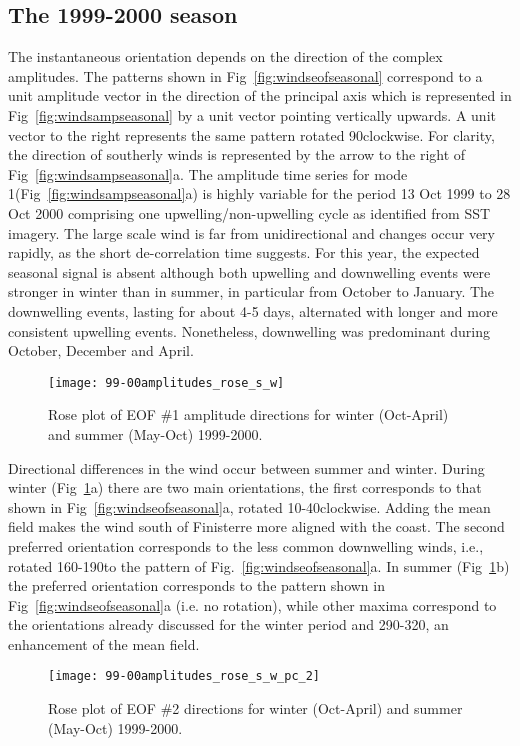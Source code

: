 \subsection{The 1999-2000 season} The instantaneous orientation
depends on the direction of the complex amplitudes. The patterns
shown in Fig~\ref{fig:windseofseasonal} correspond to a unit
amplitude vector in the direction of the principal axis which is
represented in {Fig~\ref{fig:windsampseasonal}} by a unit vector
pointing vertically upwards. A unit vector to the right represents
the same pattern rotated 90\deg clockwise. For clarity, the
direction of southerly winds is represented by the arrow to the
right of Fig~\ref{fig:windsampseasonal}a. The amplitude time
series for mode 1(Fig~\ref{fig:windsampseasonal}a) is highly
variable for the period 13 Oct 1999 to 28 Oct 2000 comprising one
upwelling/non-upwelling cycle as identified from SST imagery. The
large scale wind is far from unidirectional and changes occur very
rapidly, as the short de-correlation time suggests. For this year,
the expected seasonal signal is absent although both upwelling and
downwelling events were stronger in winter than in summer, in
particular from October to January. The downwelling events,
lasting for about 4-5 days, alternated with longer and more
consistent upwelling events. Nonetheless, downwelling was
predominant during October, December and April.
\begin{figure}
\centering
\texttt{[image: 99-00amplitudes\_rose\_s\_w]}
\caption{Rose plot of EOF \#1 amplitude directions for winter
(Oct-April) and summer (May-Oct)
1999-2000.}\label{fig:windsroseeof1}
\end{figure}

Directional differences in the wind occur between summer and
winter. During winter ({Fig~\ref{fig:windsroseeof1}}a) there are
two main orientations, the first corresponds to that shown in
Fig~\ref{fig:windseofseasonal}a, rotated 10-40\deg clockwise.
Adding the mean field makes the wind south of Finisterre more
aligned with the coast. The second preferred orientation
corresponds to the less common downwelling winds, i.e., rotated
160-190\deg to the pattern of Fig.~\ref{fig:windseofseasonal}a. In
summer (Fig~\ref{fig:windsroseeof1}b) the preferred orientation
corresponds to the pattern shown in
Fig~\ref{fig:windseofseasonal}a (i.e. no rotation), while other
maxima correspond to the orientations already discussed for the
winter period and 290-320\deg, an enhancement of the mean field.
\begin{figure}[t]
\centering
\texttt{[image: 99-00amplitudes\_rose\_s\_w\_pc\_2]}
\caption{Rose plot of EOF \#2 directions for winter (Oct-April)
and summer (May-Oct) 1999-2000.}\label{fig:windsroseeof2}
\end{figure}

